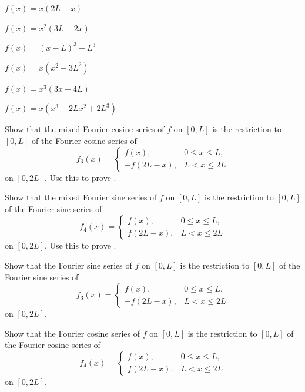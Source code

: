 \begin{exerciselist}
\item\label{exer:11.3.51}$f(x)=x(2L -x)$

\item\label{exer:11.3.52}$f(x)=x^2(3L-2x)$

\item\label{exer:11.3.53}$f(x)=(x-L)^3+L^3$

\item\label{exer:11.3.54}$f(x)=x(x^2-3L^2)$

\item\label{exer:11.3.55}$f(x)=x^3(3x-4L)$

\item\label{exer:11.3.56}$f(x)=x(x^3-2Lx^2+2L^3)$


\item\label{exer:11.3.57}Show that the mixed Fourier cosine series of $f$ on $[0,L]$ is the
restriction to $[0,L]$ of the Fourier cosine series of
\[
f_3(x)=
\begin{cases}
f(x),&0\le x\le L,\\-f(2L-x),&L< x\le 2L
\end{cases}
\]
on $[0,2L]$.  Use this to prove .

\item\label{exer:11.3.58}Show that the mixed Fourier sine series of $f$ on $[0,L]$ is the
restriction to $[0,L]$ of the Fourier sine series of
\[
f_4(x)=
\begin{cases}
f(x),&0\le x\le L,\\f(2L-x),&L< x\le 2L
\end{cases}
\]
on $[0,2L]$.  Use this to prove .


\item\label{exer:11.3.59}Show that the Fourier sine series of $f$ on $[0,L]$ is the restriction
to $[0,L]$ of the Fourier sine series of
\[
f_3(x)=
\begin{cases}
f(x),&0\le x\le L,\\-f(2L-x),&L< x\le 2L
\end{cases}
\]
on $[0,2L]$.

\item\label{exer:11.3.60}Show that  the Fourier cosine series
of $f$ on $[0,L]$
 is the restriction
to $[0,L]$ of the Fourier cosine series of
\[
f_4(x)=
\begin{cases}
f(x),&0\le x\le L,\\f(2L-x),&L< x\le 2L
\end{cases}
\]
on  $[0,2L]$.

\end{exerciselist}
